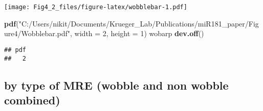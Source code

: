 \documentclass[
]{article}
\newenvironment{Shaded}{\begin{snugshade}}{\end{snugshade}}
\newcommand{\AttributeTok}[1]{\textcolor[rgb]{0.13,0.29,0.53}{#1}}
\newcommand{\DecValTok}[1]{\textcolor[rgb]{0.00,0.00,0.81}{#1}}
\newcommand{\FunctionTok}[1]{\textcolor[rgb]{0.13,0.29,0.53}{\textbf{#1}}}
\newcommand{\NormalTok}[1]{#1}
\newcommand{\StringTok}[1]{\textcolor[rgb]{0.31,0.60,0.02}{#1}}
\begin{document}
\texttt{[image: Fig4\_2\_files/figure-latex/wobblebar-1.pdf]}

\begin{Shaded}
\begin{Highlighting}[]
\FunctionTok{pdf}\NormalTok{(}\StringTok{"C:/Users/nikit/Documents/Krueger\_Lab/Publications/miR181\_paper/Figure4/Wobblebar.pdf"}\NormalTok{, }\AttributeTok{width =} \DecValTok{2}\NormalTok{, }\AttributeTok{height =} \DecValTok{1}\NormalTok{)}
\NormalTok{wobarp}
\FunctionTok{dev.off}\NormalTok{()}
\end{Highlighting}
\end{Shaded}

\begin{verbatim}
## pdf 
##   2
\end{verbatim}

\hypertarget{by-type-of-mre-wobble-and-non-wobble-combined}{%
\subsection{by type of MRE (wobble and non wobble
combined)}\label{by-type-of-mre-wobble-and-non-wobble-combined}}
\end{document}
